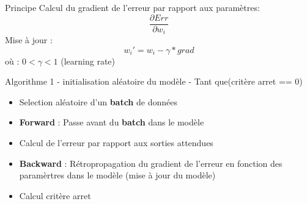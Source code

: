 
\begin{frame}{Principe}
  Calcul du gradient de l'erreur par rapport aux paramètres:
  \[
  \frac{\partial{Err}}{\partial{w_i}}
  \]
  Mise à jour :
  \[
  w_i' = w_i - \gamma * grad 
  \]
  où : $0 < \gamma < 1$ (learning rate)
\end{frame}

\begin{frame}{Algorithme}
  1 - initialisation aléatoire du modèle
   - Tant que(critère arret == 0)
  \begin{itemize}
  \item Selection aléatoire d'un \textbf{batch} de données
  \item \textbf{Forward} : Passe avant du \textbf{batch} dans le modèle
  \item Calcul de l'erreur par rapport aux sorties attendues
  \item \textbf{Backward} : Rétropropagation du gradient de l'erreur en fonction des paramèrtres dans le modèle (mise à jour du modèle)
  \item Calcul critère arret
  \end{itemize}
\end{frame}


